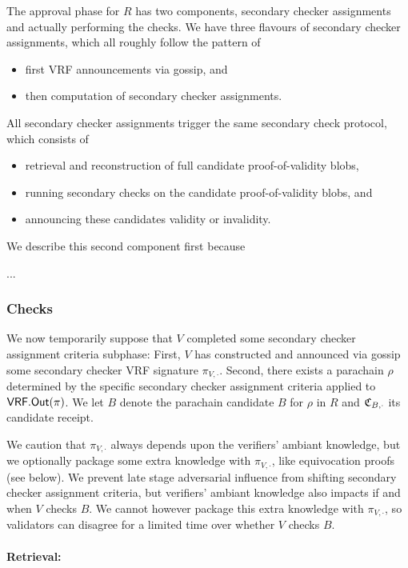 The approval phase for $R$ has two components, secondary checker assignments and actually performing the checks.  We have three flavours of secondary checker assignments, which all roughly follow the pattern of
\begin{itemize}
\item first VRF announcements via gossip, and
\item then computation of secondary checker assignments.
\end{itemize}
\noindent 
All secondary checker assignments trigger the same secondary check protocol, which consists of
\begin{itemize}
\item retrieval and reconstruction of full candidate proof-of-validity blobs, 
\item running secondary checks on the candidate proof-of-validity blobs, and 
\item announcing these candidates validity or invalidity.
\end{itemize}
We describe this second component first because 

...

\subsubsection{Checks} 

We now temporarily suppose that $V$ completed some secondary checker assignment criteria subphase:  First, $V$ has constructed and announced via gossip some secondary checker VRF signature $\pi_{V,\cdot}$.  Second, there exists a parachain $\rho$ determined by the specific secondary checker assignment criteria applied to $\mathsf{VRF}.\mathsf{Out}(\pi)$.  We let $B$ denote the parachain candidate $B$ for $\rho$ in $R$ and $\mathfrak{C}_{B,\cdot}$ its candidate receipt.  

We caution that $\pi_{V,\cdot}$ always depends upon the verifiers' ambiant knowledge, but we optionally package some extra knowledge with $\pi_{V,\cdot}$, like equivocation proofs (see below).  We prevent late stage adversarial influence from shifting secondary checker assignment criteria, but verifiers' ambiant knowledge also impacts if and when $V$ checks $B$.  We cannot however package this extra knowledge with $\pi_{V,\cdot}$, so validators can disagree for a limited time over whether $V$ checks $B$.

\smallskip
\paragraph{Retrieval:}

